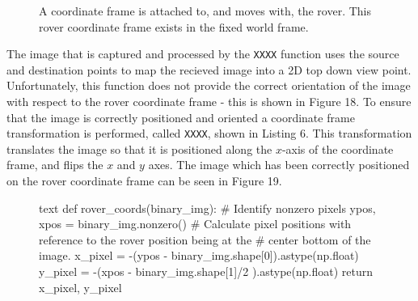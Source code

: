 \documentclass[a4paper]{article}
\begin{document}
\begin{figure}[h]
\centering
{}
\caption{A coordinate frame is attached to, and moves with, the rover. This rover coordinate frame exists in the fixed world frame.}
\end{figure}

\vspace{1cm}

The image that is captured and processed by the \verb|XXXX| function uses the source and destination points to map the recieved image into a 2D top down view point. Unfortunately, this function does not provide the correct orientation of the image with respect to the rover coordinate frame - this is shown in Figure 18. To ensure that the image is correctly positioned and oriented a coordinate frame transformation is performed, called \verb|XXXX|, shown in Listing 6. This transformation translates the image so that it is positioned along the $x$-axis of the coordinate frame, and flips the $x$ and $y$ axes. The image which has been correctly positioned on the rover coordinate frame can be seen in Figure 19. 

\vspace{1cm}

\begin{figure}[h]\scriptsize
\centering
\begin{sexylisting}{text}
def rover_coords(binary_img):
    # Identify nonzero pixels
    ypos, xpos = binary_img.nonzero()
    # Calculate pixel positions with reference to the rover position being at the 
    # center bottom of the image.  
    x_pixel = -(ypos - binary_img.shape[0]).astype(np.float)
    y_pixel = -(xpos - binary_img.shape[1]/2 ).astype(np.float)
    return x_pixel, y_pixel
\end{sexylisting}
\end{figure}
\end{document}

